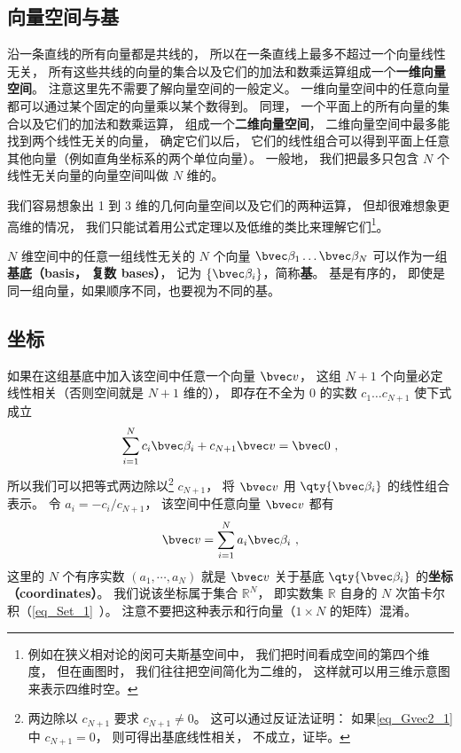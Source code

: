 \subsection{向量空间与基}
沿一条直线的所有向量都是共线的， 所以在一条直线上最多不超过一个向量线性无关， 所有这些共线的向量的集合以及它们的加法和数乘运算组成一个\textbf{一维向量空间}。 注意这里先不需要了解向量空间的一般定义。 一维向量空间中的任意向量都可以通过某个固定的向量乘以某个数得到。 同理， 一个平面上的所有向量的集合以及它们的加法和数乘运算， 组成一个\textbf{二维向量空间}， 二维向量空间中最多能找到两个线性无关的向量， 确定它们以后， 它们的线性组合可以得到平面上任意其他向量（例如直角坐标系的两个单位向量）。 一般地， 我们把最多只包含 $N$ 个线性无关向量的向量空间叫做 $N$ 维的。

我们容易想象出 1 到 3 维的几何向量空间以及它们的两种运算， 但却很难想象更高维的情况， 我们只能试着用公式定理以及低维的类比来理解它们\footnote{例如在狭义相对论的闵可夫斯基空间中， 我们把时间看成空间的第四个维度， 但在画图时， 我们往往把空间简化为二维的， 这样就可以用三维示意图来表示四维时空。}。

$N$ 维空间中的任意一组线性无关的 $N$ 个向量 $\bvec \beta_1\dots \bvec \beta_N$ 可以作为一组\textbf{基底（basis， 复数 bases）}， 记为 $\{\bvec \beta_i\}$，简称\textbf{基}。 基是有序的， 即使是同一组向量，如果顺序不同，也要视为不同的基。

\subsection{坐标}
如果在这组基底中加入该空间中任意一个向量 $\bvec v$， 这组 $N+1$ 个向量必定线性相关（否则空间就是 $N+1$ 维的）， 即存在不全为 0 的实数 $c_1\dots c_{N+1}$ 使下式成立
\begin{equation}\label{eq_Gvec2_1}
\sum_{i=1}^{N} c_i \bvec \beta_i + c_{N+1} \bvec v = \bvec 0~,
\end{equation}
所以我们可以把等式两边除以\footnote{两边除以 $c_{N+1}$ 要求 $c_{N+1} \ne 0$。 这可以通过反证法证明： 如果\autoref{eq_Gvec2_1} 中 $c_{N+1} = 0$， 则可得出基底线性相关， 不成立，证毕。} $c_{N+1}$， 将 $\bvec v$ 用 $\qty{\bvec \beta_i}$ 的线性组合表示。 令 $a_i = -c_i/c_{N+1}$， 该空间中任意向量 $\bvec v$ 都有
\begin{equation}\label{eq_Gvec2_5}
\bvec v = \sum_{i=1}^N a_i \bvec \beta_i~,
\end{equation}
这里的 $N$ 个有序实数 $(a_1, \cdots, a_N)$ 就是 $\bvec v$ 关于基底 $\qty{\bvec \beta_i}$ 的\textbf{坐标（coordinates）}。 我们说该坐标属于集合 $\mathbb R^N$， 即实数集 $\mathbb R$ 自身的 $N$ 次笛卡尔积（\autoref{eq_Set_1}~）。 注意不要把这种表示和行向量（$1\times N$ 的矩阵）混淆。

